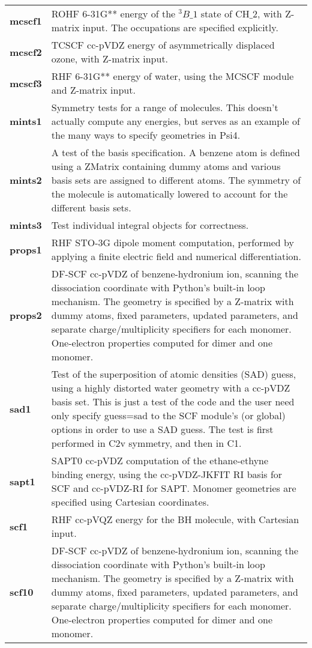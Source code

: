 \begin{tabular*}{\textwidth}[tb]{p{}p{}}
{\bf mcscf1} &  ROHF 6-31G** energy of the $^3B\_1$ state of CH$\_2$, with Z-matrix input. The occupations are specified explicitly.\\
{\bf mcscf2} &  TCSCF cc-pVDZ  energy of asymmetrically displaced ozone, with Z-matrix input.\\
{\bf mcscf3} &  RHF 6-31G** energy of water, using the MCSCF module and Z-matrix input.\\
{\bf mints1} &  Symmetry tests for a range of molecules.  This doesn't actually compute any energies, but serves as an example of the many ways to specify geometries in Psi4.\\
{\bf mints2} &  A test of the basis specification.  A benzene atom is defined using a ZMatrix containing dummy atoms and various basis sets are assigned to different atoms.  The symmetry of the molecule is automatically lowered to account for the different basis sets.\\
{\bf mints3} &  Test individual integral objects for correctness.\\
{\bf props1} &  RHF STO-3G dipole moment computation, performed by applying a finite electric field and numerical differentiation.\\
{\bf props2} &  DF-SCF cc-pVDZ of benzene-hydronium ion, scanning the dissociation coordinate with Python's built-in loop mechanism. The geometry is specified by a Z-matrix with dummy atoms, fixed parameters, updated parameters, and separate charge/multiplicity specifiers for each monomer. One-electron properties computed for dimer and one monomer.\\
{\bf sad1} &  Test of the superposition of atomic densities (SAD) guess, using a highly distorted water geometry with a cc-pVDZ basis set.  This is just a test of the code and the user need only specify guess=sad to the SCF module's (or global) options in order to use a SAD guess. The test is first performed in C2v symmetry, and then in C1.\\
{\bf sapt1} &  SAPT0 cc-pVDZ computation of the ethane-ethyne binding energy, using the cc-pVDZ-JKFIT RI basis for SCF and cc-pVDZ-RI for SAPT.  Monomer geometries are specified using Cartesian coordinates.\\
{\bf scf1} &  RHF cc-pVQZ energy for the BH molecule, with Cartesian input.\\
{\bf scf10} &  DF-SCF cc-pVDZ of benzene-hydronium ion, scanning the dissociation coordinate with Python's built-in loop mechanism. The geometry is specified by a Z-matrix with dummy atoms, fixed parameters, updated parameters, and separate charge/multiplicity specifiers for each monomer. One-electron properties computed for dimer and one monomer.\\

\end{tabular*}
